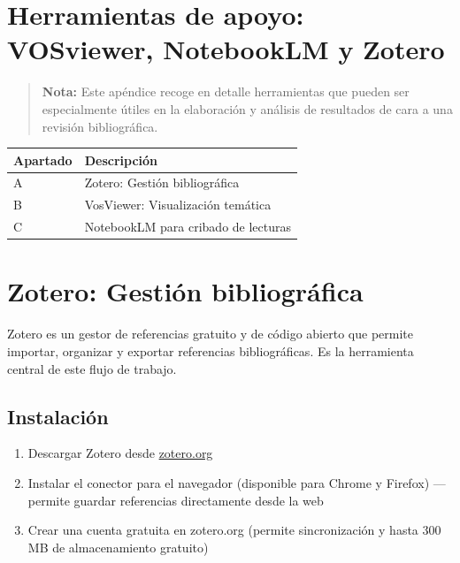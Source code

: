 \documentclass[
]{book}
\newcounter{none} %
\providecommand{\tightlist}{%
  \setlength{\itemsep}{0pt}\setlength{\parskip}{0pt}}
\begin{document}
\appendix


\chapter*{Herramientas de apoyo: VOSviewer, NotebookLM y Zotero}\label{herramientas-de-apoyo-vosviewer-notebooklm-y-zotero}

\begin{quote}
\textbf{Nota:} Este apéndice recoge en detalle herramientas que pueden ser especialmente útiles en la elaboración y análisis de resultados de cara a una revisión bibliográfica.
\end{quote}

{\def\LTcaptype{none} %
\begin{longtable}[]{@{}ll@{}}
\toprule\noalign{}
Apartado & Descripción \\
\midrule\noalign{}
\endhead
\bottomrule\noalign{}
\endlastfoot
A & Zotero: Gestión bibliográfica \\
B & VosViewer: Visualización temática \\
C & NotebookLM para cribado de lecturas \\
\end{longtable}
}

\chapter{Zotero: Gestión bibliográfica}\label{zotero}

Zotero es un gestor de referencias gratuito y de código abierto que permite importar, organizar y exportar referencias bibliográficas. Es la herramienta central de este flujo de trabajo.

\section{Instalación}\label{instalaciuxf3n}

\begin{enumerate}
\def\labelenumi{\arabic{enumi}.}
\tightlist
\item
  Descargar Zotero desde \href{https://www.zotero.org/download/}{zotero.org}
\item
  Instalar el conector para el navegador (disponible para Chrome y Firefox) --- permite guardar referencias directamente desde la web
\item
  Crear una cuenta gratuita en zotero.org (permite sincronización y hasta 300 MB de almacenamiento gratuito)
\end{enumerate}
\end{document}
